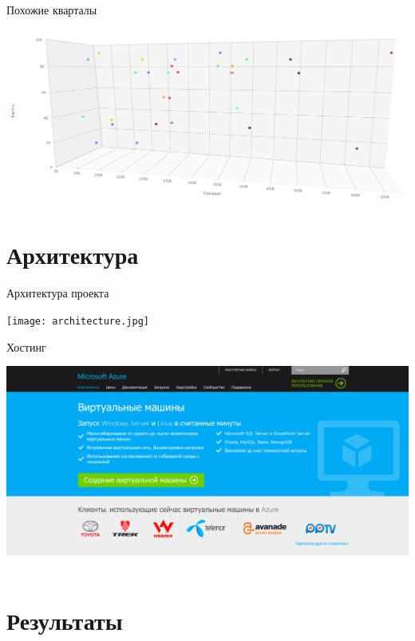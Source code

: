 \documentclass[14pt, fleqn, xcolor={dvipsnames, table}]{beamer}
\begin{document}
        \begin{frame}{Похожие кварталы}
            \begin{center}
                \includegraphics[scale=0.27]{nn.png}
            \end{center}
        \end{frame}
        
    \section{Архитектура}          
        
        \begin{frame}{Архитектура проекта}
            \begin{center}
                \texttt{[image: architecture.jpg]}
            \end{center}
        \end{frame}
        
        \begin{frame}{Хостинг}
            \begin{center}
                \includegraphics[scale=0.25]{azure.png}
            \end{center}
        \end{frame}
        
    \section{Результаты}           
        
\end{document}
